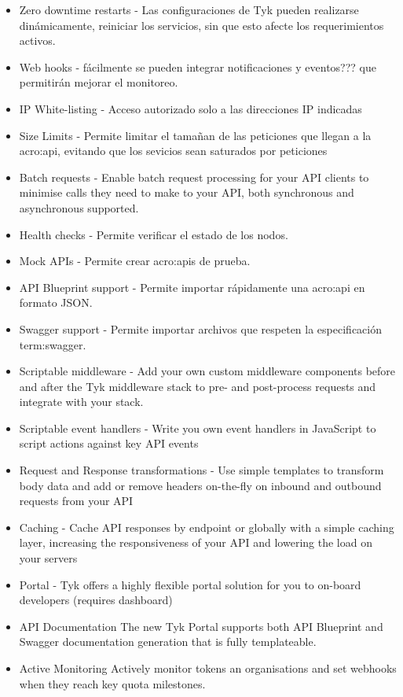 \begin{itemize}
  \item Zero downtime restarts - Las configuraciones de Tyk pueden realizarse dinámicamente, reiniciar los servicios, sin que esto afecte los requerimientos activos.
  \item Web hooks - fácilmente se pueden integrar notificaciones y eventos??? que permitirán mejorar el monitoreo.
  \item IP White-listing - Acceso autorizado solo a las direcciones IP indicadas
  \item Size Limits - Permite limitar el tamañan de las peticiones que llegan a la \gls{acro:api}, evitando que los sevicios sean saturados por peticiones
  \item Batch requests - Enable batch request processing for your API clients to minimise calls they need to make to your API, both synchronous and asynchronous supported.
  \item Health checks - Permite verificar el estado de los nodos.
  \item Mock APIs - Permite crear \glspl{acro:api} de prueba.
  \item API Blueprint support - Permite importar rápidamente una \gls{acro:api} en formato JSON.
  \item Swagger support - Permite importar archivos que respeten la especificación \gls{term:swagger}.
  \item Scriptable middleware - Add your own custom middleware components before and after the Tyk middleware stack to pre- and post-process requests and integrate with your stack.
  \item Scriptable event handlers - Write you own event handlers in JavaScript to script actions against key API events
  \item Request and Response transformations - Use simple templates to transform body data and add or remove headers on-the-fly on inbound and outbound requests from your API
  \item Caching - Cache API responses by endpoint or globally with a simple caching layer, increasing the responsiveness of your API and lowering the load on your servers
  \item Portal - Tyk offers a highly flexible portal solution for you to on-board developers (requires dashboard)
  \item API Documentation The new Tyk Portal supports both API Blueprint and Swagger documentation generation that is fully templateable.
  \item Active Monitoring Actively monitor tokens an organisations and set webhooks when they reach key quota milestones.

\end{itemize}
